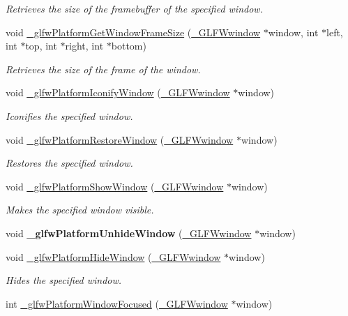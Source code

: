 \begin{DoxyCompactItemize}
\begin{DoxyCompactList}\small\item\em Retrieves the size of the framebuffer of the specified window. \end{DoxyCompactList}\item 
void \hyperlink{group__platform_ga5dbdea593f2ce9dcc0c83bb5f318d598}{\+\_\+glfw\+Platform\+Get\+Window\+Frame\+Size} (\hyperlink{struct__GLFWwindow}{\+\_\+\+G\+L\+F\+Wwindow} $\ast$window, int $\ast$left, int $\ast$top, int $\ast$right, int $\ast$bottom)
\begin{DoxyCompactList}\small\item\em Retrieves the size of the frame of the window. \end{DoxyCompactList}\item 
void \hyperlink{group__platform_ga2573aaf669aa4467fd3273dc24630be2}{\+\_\+glfw\+Platform\+Iconify\+Window} (\hyperlink{struct__GLFWwindow}{\+\_\+\+G\+L\+F\+Wwindow} $\ast$window)
\begin{DoxyCompactList}\small\item\em Iconifies the specified window. \end{DoxyCompactList}\item 
void \hyperlink{group__platform_ga7d70bc903e5c7b565bdb8fe795348c1d}{\+\_\+glfw\+Platform\+Restore\+Window} (\hyperlink{struct__GLFWwindow}{\+\_\+\+G\+L\+F\+Wwindow} $\ast$window)
\begin{DoxyCompactList}\small\item\em Restores the specified window. \end{DoxyCompactList}\item 
void \hyperlink{group__platform_gabc4c51c7c430fab92aec7797734f44a7}{\+\_\+glfw\+Platform\+Show\+Window} (\hyperlink{struct__GLFWwindow}{\+\_\+\+G\+L\+F\+Wwindow} $\ast$window)
\begin{DoxyCompactList}\small\item\em Makes the specified window visible. \end{DoxyCompactList}\item 
\hypertarget{group__platform_ga3c4f24ce5024f55a1f89a6aac534589f}{}void {\bfseries \+\_\+glfw\+Platform\+Unhide\+Window} (\hyperlink{struct__GLFWwindow}{\+\_\+\+G\+L\+F\+Wwindow} $\ast$window)\label{group__platform_ga3c4f24ce5024f55a1f89a6aac534589f}

\item 
void \hyperlink{group__platform_ga903498be431ea21170c4ea1b80791204}{\+\_\+glfw\+Platform\+Hide\+Window} (\hyperlink{struct__GLFWwindow}{\+\_\+\+G\+L\+F\+Wwindow} $\ast$window)
\begin{DoxyCompactList}\small\item\em Hides the specified window. \end{DoxyCompactList}\item 
\hypertarget{group__platform_gac239b1980772ae5c5f1b1f683b1aa1ea}{}int \hyperlink{group__platform_gac239b1980772ae5c5f1b1f683b1aa1ea}{\+\_\+glfw\+Platform\+Window\+Focused} (\hyperlink{struct__GLFWwindow}{\+\_\+\+G\+L\+F\+Wwindow} $\ast$window)\label{group__platform_gac239b1980772ae5c5f1b1f683b1aa1ea}


\end{DoxyCompactItemize}
